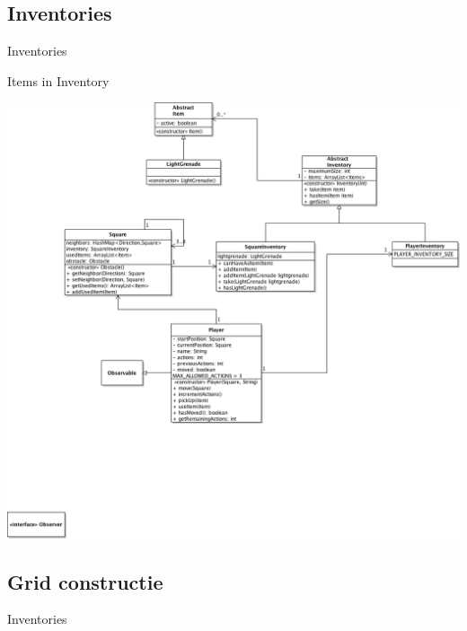 \documentclass[t]{beamer}
\begin{document}
\subsection{Inventories}
\begin{frame}{Inventories}
\begin{multicols}{2}
\tableofcontents[currentsection]
\end{multicols}
\end{frame}

\begin{frame}[plain]{Items in Inventory}
\begin{center}
\includegraphics[width= 0.9\linewidth]{../uml/classdiagramInventory.png}
\end{center}
\end{frame}

\subsection{Grid constructie}
\begin{frame}{Inventories}
\begin{multicols}{2}
\tableofcontents[currentsection]
\end{multicols}
\end{frame}
\end{document}
